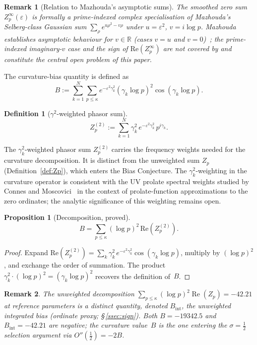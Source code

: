 \documentclass[11pt]{article}
\newtheorem{proposition}[theorem]{Proposition}
\newtheorem{definition}[theorem]{Definition}
\newtheorem*{remark}{Remark}
\begin{document}
\begin{remark}[Relation to Mazhouda's asymptotic sums]
The smoothed zero sum $Z_p^\infty(\varepsilon)$ is formally a
prime-indexed complex specialisation of Mazhouda's Selberg-class
Gaussian sum $\sum_\rho e^{u\rho^2 - v\rho}$
\cite{Mazhouda} under $u = \varepsilon^2$, $v = i\log p$.
Mazhouda establishes asymptotic behaviour for $v \in \mathbb{R}$
(cases $v = u$ and $v = 0$)~\cite{Mazhouda};
the prime-indexed imaginary-$v$ case and the sign of
$\mathrm{Re}(Z_p^\infty)$ are not covered by \cite{Mazhouda}
and constitute the central open problem of this paper.
\end{remark}

The curvature-bias quantity is defined as
\[
B := \sum_{k=1}^N\sum_{p\leq\kappa}
     e^{-\varepsilon^2\gamma_k^2}(\gamma_k\log p)^2\cos(\gamma_k\log p).
\]

\begin{definition}[$\gamma^2$-weighted phasor sum]
\label{def:Zp2}
\[
Z_p^{(2)} := \sum_{k=1}^N \gamma_k^2\,
             e^{-\varepsilon^2\gamma_k^2}\,p^{i\gamma_k}.
\]
\end{definition}

\noindent
The $\gamma_k^2$-weighted phasor sum $Z_p^{(2)}$ carries the
frequency weights needed for the curvature decomposition.
It is distinct from the unweighted sum $Z_p$
(Definition~\ref{def:Zp}), which enters the Bias Conjecture.
The $\gamma_k^2$-weighting in the curvature operator is consistent
with the UV prolate spectral weights studied by Connes and
Moscovici~\cite{ConnesMoscovici22} in the context of prolate-function
approximations to the zero ordinates; the analytic significance of
this weighting remains open.

\begin{proposition}[Decomposition, proved]
\label{prop:decomp}
\[
B = \sum_{p\leq\kappa}(\log p)^2\,\mathrm{Re}(Z_p^{(2)}).
\]
\end{proposition}

\begin{proof}
Expand $\mathrm{Re}(Z_p^{(2)})
= \sum_k \gamma_k^2\,e^{-\varepsilon^2\gamma_k^2}\cos(\gamma_k\log p)$,
multiply by $(\log p)^2$, and exchange the order of summation.
The product $\gamma_k^2\cdot(\log p)^2 = (\gamma_k\log p)^2$
recovers the definition of~$B$.
\end{proof}

\begin{remark}
The unweighted decomposition
$\sum_{p\leq\kappa}(\log p)^2\operatorname{Re}(Z_p) = -42.21$
at reference parameters is a distinct quantity, denoted
$B_{\mathrm{int}}$, the unweighted integrated bias
(ordinate proxy; \S\,\ref{ssec:sign}).
Both $B=-19342.5$ and $B_{\mathrm{int}}=-42.21$ are negative;
the curvature value~$B$ is the one entering the
$\sigma=\tfrac{1}{2}$ selection argument via
$O''(\tfrac12)=-2B$.
\end{remark}
\end{document}
